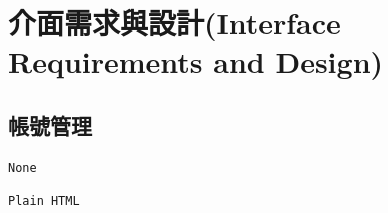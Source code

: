 \documentclass{article}
\begin{document}
\newpage

\section[介面需求與設計(INTERFACE REQUIREMENTS AND DESIGN)]{介面需求與設計(Interface Requirements and Design)}

\newcommand{\IRTable}[6]{
	\begin{tabularx}{0.95\textwidth}{|c|Y|Y|}
		\hline
		\rowcolor{LightGray} 介面名稱              & 介面提供者                & 介面使用者                 \\
		\rowcolor{LightGray} (Interface Name)  & (Interface Provider) & (Interface Consumer)  \\ \hline
		#1                                     & #2                   & #3                    \\ \hline
		\rowcolor{LightGray} 連結方式              & 輸入資料                 & 輸出資料                  \\
		\rowcolor{LightGray} (Connection Type) & (Input Data)         & (Output Data)         \\ \hline
		\texttt{#4}                            & \usebox\jsoninputbox & \usebox\jsonoutputbox \\ \hline
		\rowcolor{LightGray} \multicolumn{3}{|c|}{ URL }                                      \\ \hline
		\multicolumn{3}{|c|}{\texttt{#5}}                                                     \\ \hline
		\rowcolor{LightGray} \multicolumn{3}{|c|}{  介面描述 (Interface Description) }            \\ \hline
		\multicolumn{3}{|c|}{#6}                                                              \\ \hline
	\end{tabularx}
}

\subsection{帳號管理}

\begin{lrbox}{\jsoninputbox}
	\begin{lstlisting}
None
\end{lstlisting}
\end{lrbox}

\begin{lrbox}{\jsonoutputbox}
	\begin{lstlisting}
Plain HTML
\end{lstlisting}
\end{lrbox}
\end{document}
